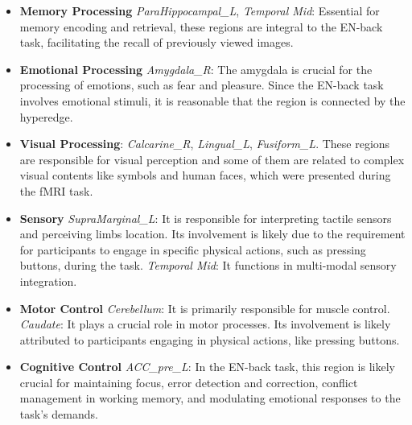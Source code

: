 \begin{itemize}
\item \textbf{Memory Processing} \textit{ParaHippocampal\_L}, \textit{Temporal Mid}: Essential for memory encoding and retrieval, these regions are integral to the EN-back task, facilitating the recall of previously viewed images.

\item \textbf{Emotional Processing} \textit{Amygdala\_R}: The amygdala is crucial for the processing of emotions, such as fear and pleasure. Since the EN-back task involves emotional stimuli, it is reasonable that the region is connected by the hyperedge.

\item \textbf{Visual Processing}: \textit{Calcarine\_R}, \textit{Lingual\_L}, \textit{Fusiform\_L}. These regions are responsible for visual perception and some of them are related to complex visual contents like symbols and human faces, which were presented during the fMRI task.

\item \textbf{Sensory} \textit{SupraMarginal\_L}: It is responsible for interpreting tactile sensors and perceiving limbs location. Its involvement is likely due to the requirement for participants to engage in specific physical actions, such as pressing buttons, during the task. \textit{Temporal Mid}: It functions in multi-modal sensory integration.

\item \textbf{Motor Control} \textit{Cerebellum}: It is primarily responsible for muscle control. \textit{Caudate}: It plays a crucial role in motor processes.  Its involvement is likely attributed to participants engaging in physical actions, like pressing buttons.

\item \textbf{Cognitive Control} \textit{ACC\_pre\_L}:  In the EN-back task, this region is likely crucial for maintaining focus, error detection and correction, conflict management in working memory, and modulating emotional responses to the task's demands.
\end{itemize}